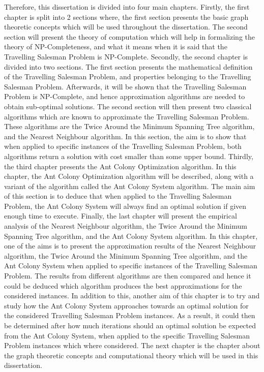 \documentclass[12pt]{article}
\numberwithin{equation}{subsection}
\numberwithin{table}{subsection}
\numberwithin{algorithm}{subsection}
\begin{document}
Therefore, this dissertation is divided into four main chapters. Firstly, the first chapter is split into 2 sections where, the first section presents the basic graph theoretic concepts which will be used throughout the dissertation. The second section will present the theory of computation which will help in formalizing the theory of NP-Completeness, and what it means when it is said that the Travelling Salesman Problem is NP-Complete. Secondly, the second chapter is divided into two sections. The first section presents the mathematical definition of the Travelling Salesman Problem, and properties belonging to the Travelling Salesman Problem. Afterwards, it will be shown that the Travelling Salesman Problem is NP-Complete, and hence approximation algorithms are needed to obtain sub-optimal solutions. The second section will then present two classical algorithms which are known to approximate the Travelling Salesman Problem. These algorithms are the Twice Around the Minimum Spanning Tree algorithm, and the Nearest Neighbour algorithm. In this section, the aim is to show that when applied to specific instances of the Travelling Salesman Problem, both algorithms return a solution with cost smaller than some upper bound. Thirdly, the third chapter presents the Ant Colony Optimization algorithm. In this chapter, the Ant Colony Optimization algorithm will be described, along with a variant of the algorithm called the Ant Colony System algorithm. The main aim of this section is to deduce that when applied to the Travelling Salesman Problem, the Ant Colony System will always find an optimal solution if given enough time to execute. Finally, the last chapter will present the empirical analysis of the Nearest Neighbour algorithm, the Twice Around the Minimum Spanning Tree algorithm, and the Ant Colony System algorithm. In this chapter, one of the aims is to present the approximation results of the Nearest Neighbour algorithm, the Twice Around the Minimum Spanning Tree algorithm, and the Ant Colony System when applied to specific instances of the Travelling Salesman Problem. The results from different algorithms are then compared and hence it could be deduced which algorithm produces the best approximations for the considered instances. In addition to this, another aim of this chapter is to try and study how the Ant Colony System approaches towards an optimal solution for the considered Travelling Salesman Problem instances. As a result, it could then be determined after how much iterations should an optimal solution be expected from the Ant Colony System, when applied to the specific Travelling Salesman Problem instances which where considered. The next chapter is the chapter about the graph theoretic concepts and computational theory which will be used in this dissertation.
\end{document}
